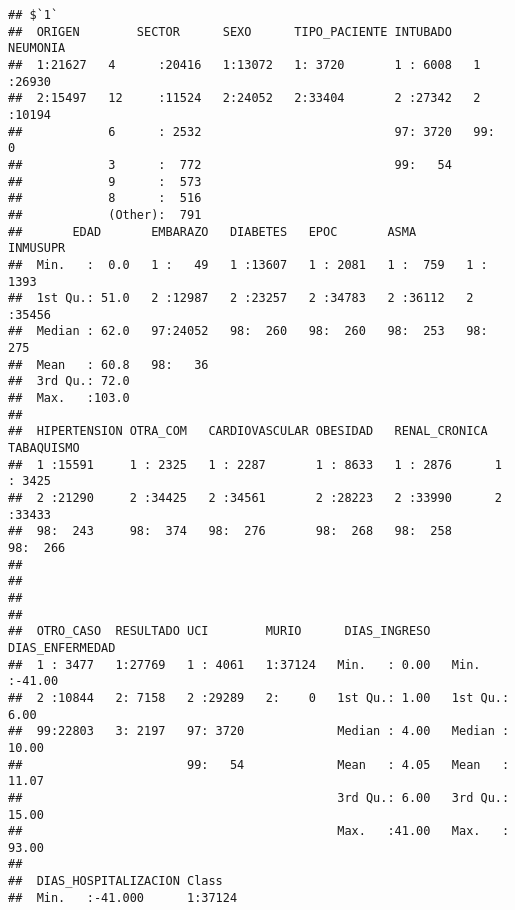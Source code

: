 \documentclass[]{article}
\begin{document}
\begin{verbatim}
## $`1`
##  ORIGEN        SECTOR      SEXO      TIPO_PACIENTE INTUBADO   NEUMONIA  
##  1:21627   4      :20416   1:13072   1: 3720       1 : 6008   1 :26930  
##  2:15497   12     :11524   2:24052   2:33404       2 :27342   2 :10194  
##            6      : 2532                           97: 3720   99:    0  
##            3      :  772                           99:   54             
##            9      :  573                                                
##            8      :  516                                                
##            (Other):  791                                                
##       EDAD       EMBARAZO   DIABETES   EPOC       ASMA       INMUSUPR  
##  Min.   :  0.0   1 :   49   1 :13607   1 : 2081   1 :  759   1 : 1393  
##  1st Qu.: 51.0   2 :12987   2 :23257   2 :34783   2 :36112   2 :35456  
##  Median : 62.0   97:24052   98:  260   98:  260   98:  253   98:  275  
##  Mean   : 60.8   98:   36                                              
##  3rd Qu.: 72.0                                                         
##  Max.   :103.0                                                         
##                                                                        
##  HIPERTENSION OTRA_COM   CARDIOVASCULAR OBESIDAD   RENAL_CRONICA TABAQUISMO
##  1 :15591     1 : 2325   1 : 2287       1 : 8633   1 : 2876      1 : 3425  
##  2 :21290     2 :34425   2 :34561       2 :28223   2 :33990      2 :33433  
##  98:  243     98:  374   98:  276       98:  268   98:  258      98:  266  
##                                                                            
##                                                                            
##                                                                            
##                                                                            
##  OTRO_CASO  RESULTADO UCI        MURIO      DIAS_INGRESO   DIAS_ENFERMEDAD 
##  1 : 3477   1:27769   1 : 4061   1:37124   Min.   : 0.00   Min.   :-41.00  
##  2 :10844   2: 7158   2 :29289   2:    0   1st Qu.: 1.00   1st Qu.:  6.00  
##  99:22803   3: 2197   97: 3720             Median : 4.00   Median : 10.00  
##                       99:   54             Mean   : 4.05   Mean   : 11.07  
##                                            3rd Qu.: 6.00   3rd Qu.: 15.00  
##                                            Max.   :41.00   Max.   : 93.00  
##                                                                            
##  DIAS_HOSPITALIZACION Class    
##  Min.   :-41.000      1:37124  

\end{verbatim}
\end{document}
